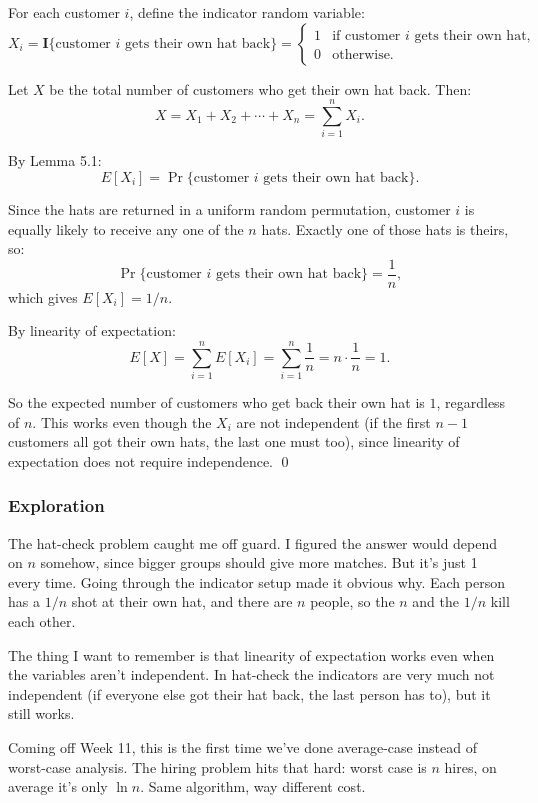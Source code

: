 \documentclass{article}
\theoremstyle{theorem}
\theoremstyle{definition}
\theoremstyle{remark}
\begin{document}
For each customer $i$, define the indicator random variable:
\[
  X_i = \mathbf{I}\{\text{customer } i \text{ gets their own hat back}\} =
  \begin{cases}
    1 & \text{if customer } i \text{ gets their own hat,} \\
    0 & \text{otherwise.}
  \end{cases}
\]

Let $X$ be the total number of customers who get their own hat back. Then:
\[
  X = X_1 + X_2 + \cdots + X_n = \sum_{i=1}^{n} X_i.
\]

By Lemma 5.1:
\[
  E[X_i] = \Pr\{\text{customer } i \text{ gets their own hat back}\}.
\]

Since the hats are returned in a uniform random permutation, customer $i$ is equally likely to receive any one of the $n$ hats. Exactly one of those hats is theirs, so:
\[
  \Pr\{\text{customer } i \text{ gets their own hat back}\} = \frac{1}{n},
\]
which gives $E[X_i] = 1/n$.

By linearity of expectation:
\[
  E[X] = \sum_{i=1}^{n} E[X_i] = \sum_{i=1}^{n} \frac{1}{n} = n \cdot \frac{1}{n} = 1.
\]

So the expected number of customers who get back their own hat is $1$, regardless of $n$. This works even though the $X_i$ are not independent (if the first $n-1$ customers all got their own hats, the last one must too), since linearity of expectation does not require independence. \qed

\subsubsection{Exploration}

The hat-check problem caught me off guard. I figured the answer would depend on $n$ somehow, since bigger groups should give more matches. But it's just 1 every time. Going through the indicator setup made it obvious why. Each person has a $1/n$ shot at their own hat, and there are $n$ people, so the $n$ and the $1/n$ kill each other.

The thing I want to remember is that linearity of expectation works even when the variables aren't independent. In hat-check the indicators are very much not independent (if everyone else got their hat back, the last person has to), but it still works.

Coming off Week 11, this is the first time we've done average-case instead of worst-case analysis. The hiring problem hits that hard: worst case is $n$ hires, on average it's only $\ln n$. Same algorithm, way different cost.
\end{document}
